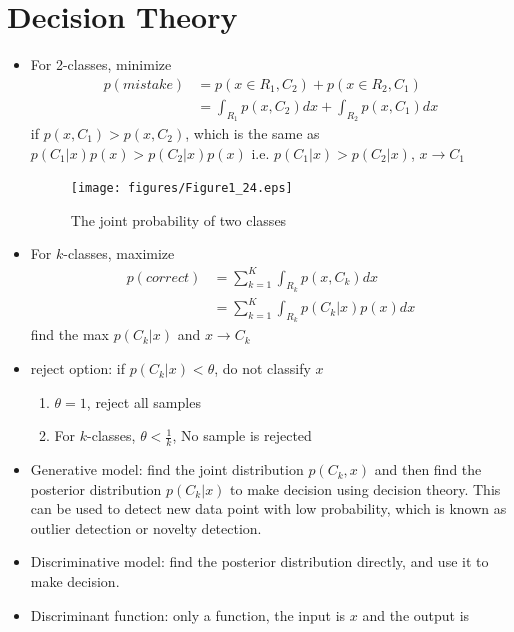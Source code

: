 \documentclass[UTF8]{article}
\begin{document}
    \section{Decision Theory}
    \begin{itemize}
        \item For 2-classes, minimize
        \begin{align*}
            p(mistake)&=p(x\in R_1,C_2)+p(x\in R_2, C_1)\\
            &=\int_{R_1}p(x,C_2)dx+\int_{R_2}p(x,C_1)dx
        \end{align*}
        if $p(x,C_1)>p(x,C_2)$, which is the same as $p(C_1|x)p(x)>p(C_2|x)p(x)$ i.e. 
        $p(C_1|x)>p(C_2|x)$, $x\rightarrow C_1$
        \begin{figure}[ht]
            \begin{center}
                \texttt{[image: figures/Figure1\_24.eps]}
                \caption{The joint probability of two classes}
            \end{center}
        \end{figure}
        \item For $k$-classes, maximize
        \begin{align*}
            p(correct)&=\sum_{k=1}^K\int_{R_k}p(x,C_k)dx\\
            &=\sum_{k=1}^K\int_{R_k}p(C_k|x)p(x)dx
        \end{align*}
        find the max $p(C_k|x)$ and $x\rightarrow C_k$
        \item reject option: if $p(C_k|x)<\theta$, do not classify $x$
        \begin{enumerate}
            \item $\theta=1$, reject all samples
            \item For $k$-classes, $\theta<\frac{1}{k}$, No sample is rejected
        \end{enumerate}
        \item Generative model: find the joint distribution $p(C_k,x)$ and then find
        the posterior distribution $p(C_k|x)$ to make decision using decision theory. 
        This can be used to detect new data point with low probability, which is known
        as outlier detection or novelty detection.
        \item Discriminative model: find the posterior distribution directly, and use 
        it to make decision.
        \item Discriminant function: only a function, the input is $x$ and the output is

\end{itemize}
\end{document}

